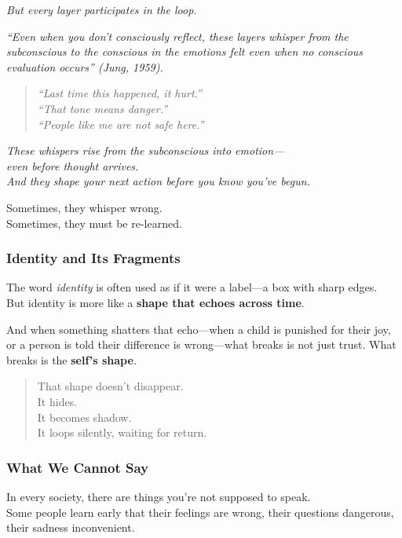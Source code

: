 \emph{But every layer participates in the loop.}

\emph{``Even when you don't consciously reflect, these layers whisper
from the subconscious to the conscious in the emotions felt even when no
conscious evaluation occurs'' (Jung, 1959).}

\begin{quote}
\emph{``Last time this happened, it hurt.''\\
``That tone means danger.''\\
``People like me are not safe here.''}
\end{quote}

\emph{These whispers rise from the subconscious into emotion---\\
even before thought arrives.\\
And they shape your next action before you know you've begun.}

Sometimes, they whisper wrong.\\
Sometimes, they must be re-learned.

\subsubsection{\texorpdfstring{\textbf{Identity and Its
Fragments}}{Identity and Its Fragments}}\label{identity-and-its-fragments}

The word \emph{identity} is often used as if it were a label---a box
with sharp edges.\\
But identity is more like a \textbf{shape that echoes across time}.

And when something shatters that echo---when a child is punished for
their joy, or a person is told their difference is wrong---what breaks
is not just trust. What breaks is the \textbf{self's shape}.

\begin{quote}
That shape doesn't disappear.\\
It hides.\\
It becomes shadow.\\
It loops silently, waiting for return.
\end{quote}

\subsubsection{\texorpdfstring{\textbf{What We Cannot
Say}}{What We Cannot Say}}\label{what-we-cannot-say}

In every society, there are things you're not supposed to speak.\\
Some people learn early that their feelings are wrong, their questions
dangerous, their sadness inconvenient.

